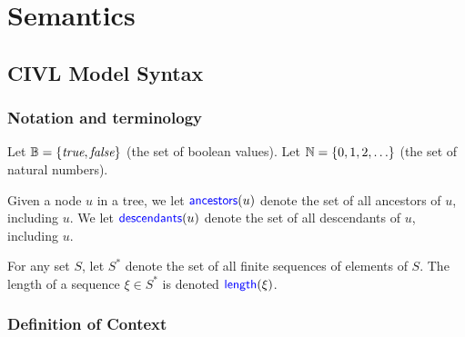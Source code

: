 \documentclass[11pt, oneside, letterpaper]{book}
\begin{document}



\part{Semantics}

\chapter{CIVL Model Syntax}

\section{Notation and terminology}
\label{sec:notation}

Let $\mathbb{B}=\{\textit{true},\textit{false}\}$ (the set of boolean values).  Let
$\mathbb{N}=\{0,1,2,\ldots\}$ (the set of natural numbers).

Given a node $u$ in a tree, we let $\textsf{\textcolor{blue}{\textup{ancestors}}}(u)$ denote the set of
all ancestors of $u$, including $u$.  We let $\textsf{\textcolor{blue}{\textup{descendants}}}(u)$ denote
the set of all descendants of $u$, including $u$.

For any set $S$, let $S^*$ denote the set of all finite sequences of
elements of $S$.  The length of a sequence $\xi\in S^*$ is denoted
$\textsf{\textcolor{blue}{\textup{length}}}(\xi)$.  


\section{Definition of Context}
\label{sec:context}
\end{document}
